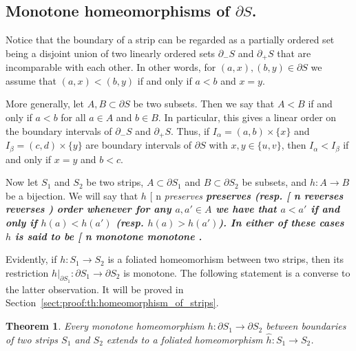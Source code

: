 \documentclass[12pt, reqno]{amsart}
\makeatletter
\newcommand{\theoremname}{Theorem}%
\newtheorem{theorem}[subsection]{\protect\theoremname}
\def\myemphInternal#1{\if n\f@shape%
\begingroup\itshape #1\endgroup\/%
\else\begingroup\bfseries #1\endgroup%
\fi}
\def\myemph{\futurelet\testchar\MaybeOptArgmyemph}
\def\MaybeOptArgmyemph{\ifx[\testchar \let\next\OptArgmyemph
                 \else \let\next\NoOptArgmyemph \fi \next}
\def\OptArgmyemph[#1]#2{\index{#1}\myemphInternal{#2}}
\def\NoOptArgmyemph#1{\myemphInternal{#1}}
\newcommand\dif{h}
\newcommand{\strip}{S}
\makeatother
\begin{document}
\subsection*{Monotone homeomorphisms of $\partial\strip$.}
Notice that the boundary of a strip can be regarded as a partially ordered set being a disjoint union of two linearly ordered sets $\partial_{-}\strip$ and $\partial_{+}\strip$ that are incomparable with each other.
In other words, for $(a,x), (b,y) \in \partial\strip$ we assume that $(a,x)<(b,y)$ if and only if $a<b$ and $x=y$.

More generally, let $A,B \subset \partial\strip$ be two subsets.
Then we say that $A<B$ if and only if $a<b$ for all $a\in A$ and $b\in B$.
In particular, this gives a linear order on the boundary intervals of $\partial_{-}\strip$ and $\partial_{+}\strip$.
Thus, if $I_{\alpha} = (a,b) \times\{x\}$ and $I_{\beta} = (c,d) \times\{y\}$ are boundary intervals of $\partial\strip$ with $x,y\in\{u,v\}$, then $I_{\alpha} < I_{\beta}$ if and only if $x=y$ and $b < c$.

Now let $\strip_1$ and $\strip_2$ be two strips, $A\subset\partial\strip_1$ and $B\subset\partial\strip_2$ be subsets, and $\dif: A \to B$ be a bijection.
We will say that $\dif$ \myemph{preserves} (resp. \myemph{reverses}) order whenever for any $a,a'\in A$ we have that $a<a'$ if and only if $\dif(a)<\dif(a')$ (resp. $\dif(a)>\dif(a')$). 
In either of these cases $\dif$ is said to be \myemph{monotone}.

Evidently, if $\dif:\strip_1\to\strip_2$ is a foliated homeomorhism between two strips, then its restriction $\dif|_{\partial\strip_1}: \partial\strip_1 \to \partial\strip_2$ is monotone.
The following statement is a converse to the latter observation. 
It will be proved in Section~\ref{sect:proof:th:homeomorphism_of_strips}.



\begin{theorem}\label{th:homeomorphism_of_strips}
Every monotone homeomorphism $\dif: \partial \strip_1 \rightarrow \partial \strip_2$ between boundaries of two strips $\strip_1$ and $\strip_2$ extends to a foliated homeomorphism $\hat{\dif}: \strip_1 \rightarrow \strip_2$.
\end{theorem}
\end{document}

